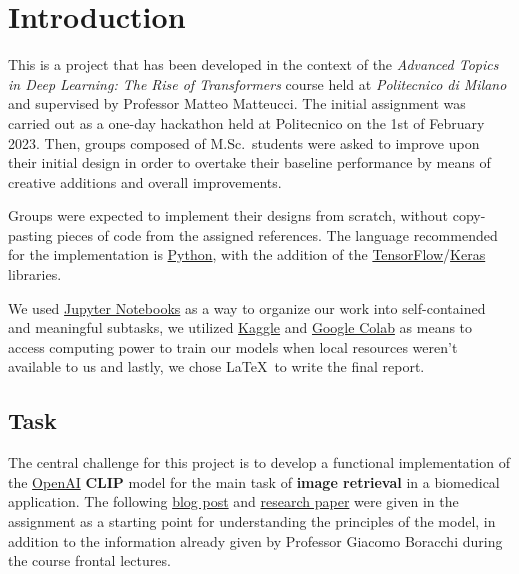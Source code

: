 \documentclass[12pt, a4paper]{article}
\begin{document}

\newpage

{
    \hypersetup{hidelinks}
    \tableofcontents
}

\newpage
{}


\section{Introduction}
This is a project that has been developed in the context of the \textit{Advanced Topics in Deep Learning: The Rise of Transformers} course held at \textit{Politecnico di Milano} and supervised by Professor Matteo Matteucci.
The initial assignment was carried out as a one-day hackathon held at Politecnico on the 1st of February 2023.
Then, groups composed of M.Sc.\ students were asked to improve upon their initial design in order to overtake their baseline performance by means of creative additions and overall improvements.

Groups were expected to implement their designs from scratch, without copy-pasting pieces of code from the assigned references.
The language recommended for the implementation is \href{https://www.python.org/}{Python}, with the addition of the \href{https://www.tensorflow.org/}{TensorFlow}/\href{https://keras.io/}{Keras} libraries.

We used \href{https://jupyter.org/}{Jupyter Notebooks} as a way to organize our work into self-contained and meaningful subtasks, we utilized \href{https://www.kaggle.com/}{Kaggle} and \href{https://colab.research.google.com}{Google Colab} as means to access computing power to train our models when local resources weren't available to us and lastly, we chose \LaTeX~to write the final report.

\subsection{Task}
The central challenge for this project is to develop a functional implementation of the \href{https://openai.com/}{OpenAI} \textbf{CLIP} model for the main task of \textbf{image retrieval} in a biomedical application.
The following \href{https://openai.com/research/clip}{blog post} and \href{https://arxiv.org/pdf/2103.00020.pdf}{research paper} were given in the assignment as a starting point for understanding the principles of the model, in addition to the information already given by Professor Giacomo Boracchi during the course frontal lectures.
\end{document}
